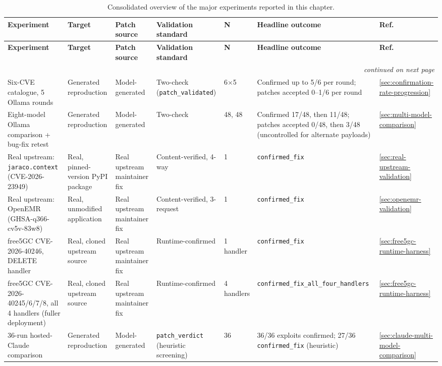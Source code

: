 \documentclass[12pt,a4paper]{report}
\begin{document}
\begin{landscape}
\begin{longtable}{@{}p{3.6cm}p{2.3cm}p{2cm}p{2.7cm}p{1.1cm}p{4.3cm}p{1.1cm}@{}}
\caption{Consolidated overview of the major experiments reported in this chapter.}
\label{tab:experiment-overview} \\
\toprule
\textbf{Experiment} & \textbf{Target} & \textbf{Patch source} & \textbf{Validation standard} & \textbf{N} & \textbf{Headline outcome} & \textbf{Ref.} \\
\midrule
\endfirsthead
\toprule
\textbf{Experiment} & \textbf{Target} & \textbf{Patch source} & \textbf{Validation standard} & \textbf{N} & \textbf{Headline outcome} & \textbf{Ref.} \\
\midrule
\endhead
\midrule
\multicolumn{7}{r}{\footnotesize\emph{continued on next page}} \\
\endfoot
\bottomrule
\endlastfoot
Six-CVE catalogue, 5 Ollama rounds & Generated reproduction & Model-generated & Two-check (\texttt{patch\_validated}) & 6$\times$5 & Confirmed up to 5/6 per round; patches accepted 0--1/6 per round & \ref{sec:confirmation-rate-progression} \\
Eight-model Ollama comparison + bug-fix retest & Generated reproduction & Model-generated & Two-check & 48, 48 & Confirmed 17/48, then 11/48; patches accepted 0/48, then 3/48 (uncontrolled for alternate payloads) & \ref{sec:multi-model-comparison} \\
Real upstream: \texttt{jaraco.context} (CVE-2026-23949) & Real, pinned-version PyPI package & Real upstream maintainer fix & Content-verified, 4-way & 1 & \texttt{confirmed\_fix} & \ref{sec:real-upstream-validation} \\
Real upstream: OpenEMR (GHSA-q366-cv5v-83w8) & Real, unmodified application & Real upstream maintainer fix & Content-verified, 3-request & 1 & \texttt{confirmed\_fix} & \ref{sec:openemr-validation} \\
free5GC CVE-2026-40246, DELETE handler & Real, cloned upstream source & Real upstream maintainer fix & Runtime-confirmed & 1 handler & \texttt{confirmed\_fix} & \ref{sec:free5gc-runtime-harness} \\
free5GC CVE-2026-40245/6/7/8, all 4 handlers (fuller deployment) & Real, cloned upstream source & Real upstream maintainer fix & Runtime-confirmed & 4 handlers & \texttt{confirmed\_fix\_\allowbreak all\_four\_\allowbreak handlers} & \ref{sec:free5gc-runtime-harness} \\
36-run hosted-Claude comparison & Generated reproduction & Model-generated & \texttt{patch\_verdict} (heuristic screening) & 36 & 36/36 exploits confirmed; 27/36 \texttt{confirmed\_fix} (heuristic) & \ref{sec:claude-multi-model-comparison} \\

\end{longtable}
\end{landscape}
\end{document}
